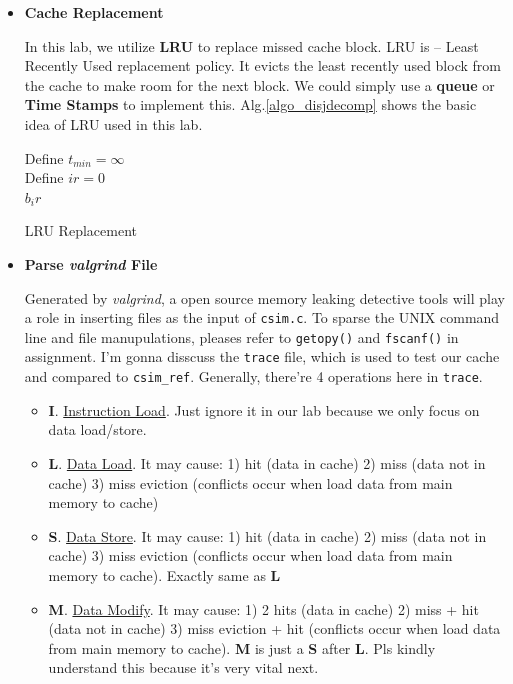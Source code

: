 \documentclass{article}
\begin{document}
\begin{itemize}
	\item \textbf{Cache Replacement}
	
	In this lab, we utilize \textbf{LRU} to replace missed cache block. LRU is –	Least	Recently	Used	replacement	policy.  It evicts	the	least	recently	used	block	from	the	cache	to	make	room		for	the	next	block. We could simply use a \textbf{queue} or \textbf{Time Stamps} to implement this. Alg.\ref{algo_disjdecomp} shows the basic idea of LRU used in this lab.~\cite{bryant2003computer}
	\begin{algorithm}   
		
		\BlankLine 
		
		Define $ t_{min} = \infty $\\
		Define $ ir = 0$ \\
	\Return $ b_ir $ 
		\caption{LRU Replacement}
		\label{algo_disjdecomp} 
	\end{algorithm}

\item \textbf{Parse \textit{valgrind} File}

Generated by \textit{valgrind}, a open source memory leaking detective tools will play a role in inserting files as the input of \lstinline|csim.c|. To sparse the UNIX command line and file manupulations, pleases refer to \lstinline|getopy()| and \lstinline|fscanf()| in assignment. I'm gonna disscuss the \lstinline|trace| file, which is used to test our cache and compared to \lstinline|csim_ref|. Generally, there're 4 operations here in \lstinline|trace|.
\begin{itemize}
	\item \textbf{I}. \underline{Instruction Load}. Just ignore it in our lab because we only focus on data load/store.
	\item \textbf{L}. \underline{Data Load}. It may cause: 1) hit (data in cache) 2) miss (data not in cache) 3) miss eviction (conflicts occur when load data from main memory to cache)
	\item \textbf{S}. \underline{Data Store}. It may cause: 1) hit (data in cache) 2) miss (data not in cache) 3) miss eviction (conflicts occur when load data from main memory to cache). Exactly same as \textbf{L}
	\item \textbf{M}. \underline{Data Modify}. It may cause: 1) 2 hits (data in cache) 2) miss + hit  (data not in cache) 3) miss eviction + hit (conflicts occur when load data from main memory to cache). \textbf{M} is just a \textbf{S} after \textbf{L}. Pls kindly understand this because it's very vital next.
\end{itemize}

\end{itemize}
\end{document}
